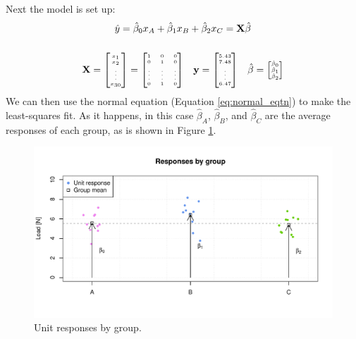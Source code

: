 \documentclass[11pt,a4paper,article]{memoir} %
\begin{document}
Next the model is set up:
\begin{gather}
	\hat{y} = \hat{\beta}_0 x_A + \hat{\beta}_{1}x_B + \hat{\beta}_{2}x_C = \mathbf{X} \hat{\beta} \label{eq:categorical_regression} \\[5mm]
	\mathbf{X} = 
		{\tiny
			\begin{bmatrix}
				x_1 \\ x_2 \\ \vdots \\ x_{30}
			\end{bmatrix}
			=
			\begin{bmatrix}
				 1 & 0 & 0 \\  0 & 1 & 0 \\ \vdots & \vdots & \vdots \\ 0 & 1 & 0
			\end{bmatrix}}
	\quad \mathbf{y} = {\tiny \begin{bmatrix} 5.43 \\ 7.48 \\ \vdots \\ 6.47 \end{bmatrix}}
	\quad \hat{\beta} = {\tiny \begin{bmatrix} \hat{\beta}_0 \\ \hat{\beta}_1 \\ \hat{\beta}_2 \end{bmatrix}}
\end{gather}
We can then use the normal equation (Equation \ref{eq:normal_eqtn}) to make the least-squares fit. As it happens, in this case $\hat{\beta}_A$, $\hat{\beta}_B$, and $\hat{\beta}_C$ are the average responses of each group, as is shown in Figure \ref{fig:categorical_regression}.
\begin{figure}[h]
\includegraphics[width=\textwidth]{categorical_regression.pdf}
\caption{Unit responses by group.}
\label{fig:categorical_regression}
\end{figure}
\end{document}
